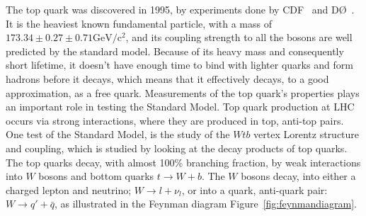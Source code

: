 \documentclass[12pt,a4paper]{article}
\numberwithin{equation}{section}
\begin{document}
The top quark was discovered in 1995, by experiments done by CDF~\cite{Abe_1995}
and DØ~\cite{Abachi_1995}. It is the heaviest known fundamental particle, with a
mass of $173.34 \pm 0.27 \pm 0.71 \mathrm{GeV/c^2}$, and its coupling strength
to all the bosons are well predicted by the standard model. Because of its heavy
mass and consequently short lifetime, it doesn't have enough time to bind with
lighter quarks and form hadrons before it decays, which means that it
effectively decays, to a good approximation, as a free quark. Measurements of
the top quark's properties plays an important role in testing the Standard
Model. Top quark production at LHC occurs via strong interactions, where they
are produced in top, anti-top pairs. One test of the Standard Model, is the
study of the $Wtb$ vertex Lorentz structure and coupling, which is studied by
looking at the decay products of top quarks. The top quarks decay, with almost
100\% branching fraction, by weak interactions into $W$ bosons and bottom quarks
$t \rightarrow W + b$. The $W$ bosons decay, into either a charged lepton and neutrino;
$W \rightarrow l + \nu_l$, or into a quark, anti-quark pair: $W \rightarrow q' + \bar{q}$, as
illustrated in the Feynman diagram Figure~\ref{fig:feynmandiagram}.\\
\end{document}
